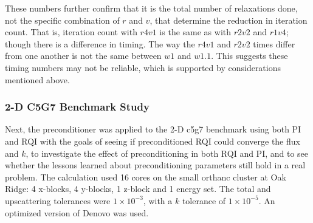 These numbers further confirm that it is the total number of relaxations done, not the specific combination of $r$ and $v$, that determine the reduction in iteration count. That is, iteration count with $r4v1$ is the same as with $r2v2$ and $r1v4$; though there is a difference in timing. The way the $r4v1$ and $r2v2$ times differ from one another is not the same between $w1$ and $w1.1$. This suggests these timing numbers may not be reliable, which is supported by considerations mentioned above.

\subsubsection{2-D C5G7 Benchmark Study}
Next, the preconditioner was applied to the 2-D c5g7 benchmark using both PI and RQI with the goals of seeing if preconditioned RQI could converge the flux and $k$, to investigate the effect of preconditioning in both RQI and PI, and to see whether the lessons learned about preconditioning parameters still hold in a real problem. The calculation used 16 cores on the small orthanc cluster at Oak Ridge: 4 x-blocks, 4 y-blocks, 1 z-block and 1 energy set. The total and upscattering tolerances were $1 \times 10^{-3}$, with a $k$ tolerance of $1 \times 10^{-5}$. An optimized version of Denovo was used.  

